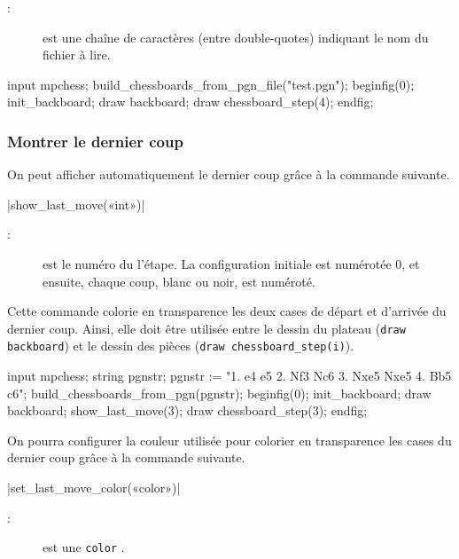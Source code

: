 \documentclass[french]{ltxdoc}
\begin{document}
\begin{description}
\item[:] est une chaîne de caractères (entre double-quotes)
indiquant le nom du fichier à lire. 
\end{description}

\begin{ExempleMP}
input mpchess;
build_chessboards_from_pgn_file("test.pgn");
beginfig(0);
init_backboard;
draw backboard;
draw chessboard_step(4); %
endfig;
\end{ExempleMP}



\subsubsection{Montrer le dernier coup}

On peut afficher automatiquement le dernier coup grâce à la commande suivante.

\commande|show_last_move(«int»)|\smallskip

\begin{description}
\item[:] est le numéro du l’étape. La configuration initiale est numérotée 0, et ensuite, chaque coup, blanc ou noir, est numéroté.
\end{description}

Cette commande colorie en transparence les deux cases de départ et d’arrivée du dernier coup. Ainsi, elle doit être utilisée entre le dessin du plateau (\lstinline+draw backboard+) et le dessin des pièces (\lstinline+draw chessboard_step(i)+).

\begin{ExempleMP}
input mpchess;
string pgnstr;
pgnstr := "1. e4 e5 2. Nf3 Nc6 3. Nxe5 Nxe5 4. Bb5 c6";
build_chessboards_from_pgn(pgnstr);
beginfig(0);
init_backboard;
draw backboard;
show_last_move(3);
draw chessboard_step(3); %
endfig;
\end{ExempleMP}

On pourra configurer la couleur utilisée pour colorier en transparence les cases du dernier coup grâce à la commande suivante.

\commande|set_last_move_color(«color»)|\smallskip
\begin{description}
  \item[:] est une \lstinline+color+ \MP.
\end{description}
\end{document}

